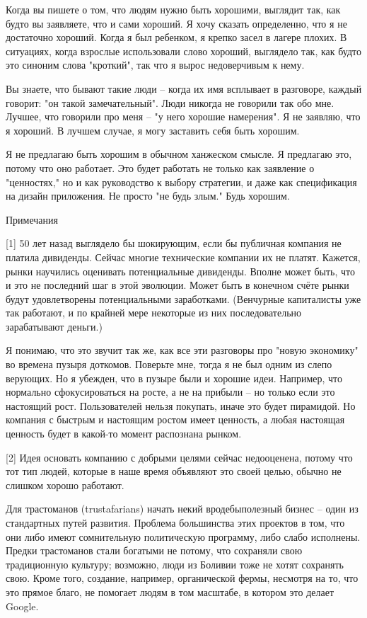 \documentclass[ebook,12pt,oneside,openany]{memoir}
\begin{document}
Когда вы пишете о том, что людям нужно быть хорошими, выглядит так,
как будто вы заявляете, что и сами хороший. Я хочу сказать
определенно, что я не достаточно хороший. Когда я был ребенком, я
крепко засел в лагере плохих. В ситуациях, когда взрослые использовали
слово хороший, выглядело так, как будто это синоним слова "кроткий",
так что я вырос недоверчивым к нему.

Вы знаете, что бывают такие люди -- когда их имя всплывает в
разговоре, каждый говорит: "он такой замечательный". Люди никогда не
говорили так обо мне. Лучшее, что говорили про меня -- "у него хорошие
намерения". Я не заявляю, что я хороший. В лучшем случае, я могу
заставить себя быть хорошим.

Я не предлагаю быть хорошим в обычном ханжеском смысле. Я предлагаю
это, потому что оно работает. Это будет работать не только как
заявление о "ценностях," но и как руководство к выбору стратегии, и
даже как спецификация на дизайн приложения. Не просто "не будь злым."
Будь хорошим.

Примечания

[1] 50 лет назад выглядело бы шокирующим, если бы публичная компания
не платила дивиденды. Сейчас многие технические компании их не платят.
Кажется, рынки научились оценивать потенциальные дивиденды. Вполне
может быть, что и это не последний шаг в этой эволюции. Может быть в
конечном счёте рынки будут удовлетворены потенциальными заработками.
(Венчурные капиталисты уже так работают, и по крайней мере некоторые
из них последовательно зарабатывают деньги.)

Я понимаю, что это звучит так же, как все эти разговоры про "новую
экономику" во времена пузыря доткомов. Поверьте мне, тогда я не был
одним из слепо верующих. Но я убежден, что в пузыре были и хорошие
идеи. Например, что нормально сфокусироваться на росте, а не на
прибыли -- но только если это настоящий рост. Пользователей нельзя
покупать, иначе это будет пирамидой. Но компания с быстрым и настоящим
ростом имеет ценность, а любая настоящая ценность будет в какой-то
момент распознана рынком.

[2] Идея основать компанию с добрыми целями сейчас недооценена, потому
что тот тип людей, которые в наше время объявляют это своей целью,
обычно не слишком хорошо работают.

Для трастоманов (trustafarians) начать некий вродебыполезный бизнес --
один из стандартных путей развития. Проблема большинства этих проектов
в том, что они либо имеют сомнительную политическую программу, либо
слабо исполнены. Предки трастоманов стали богатыми не потому, что
сохраняли свою традиционную культуру; возможно, люди из Боливии тоже
не хотят сохранять свою. Кроме того, создание, например, органической
фермы, несмотря на то, что это прямое благо, не помогает людям в том
масштабе, в котором это делает Google.
\end{document}

